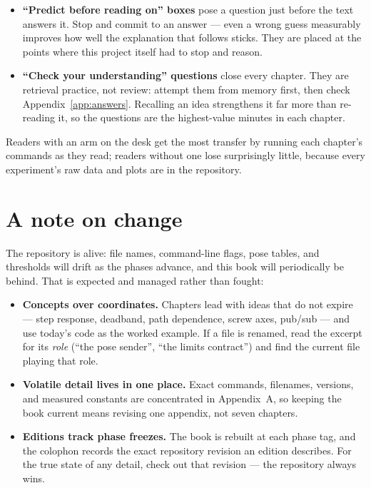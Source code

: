 \documentclass[11pt,twoside,openright]{book}
\begin{document}
\begin{itemize}
  \item \textbf{``Predict before reading on'' boxes} pose a question just
    before the text answers it. Stop and commit to an answer --- even a
    wrong guess measurably improves how well the explanation that follows
    sticks. They are placed at the points where this project itself had
    to stop and reason.
  \item \textbf{``Check your understanding'' questions} close every
    chapter. They are retrieval practice, not review: attempt them from
    memory first, then check Appendix~\ref{app:answers}. Recalling an
    idea strengthens it far more than re-reading it, so the questions are
    the highest-value minutes in each chapter.
\end{itemize}

Readers with an arm on the desk get the most transfer by running each
chapter's commands as they read; readers without one lose surprisingly
little, because every experiment's raw data and plots are in the
repository.

\section*{A note on change}

The repository is alive: file names, command-line flags, pose tables, and
thresholds will drift as the phases advance, and this book will
periodically be behind. That is expected and managed rather than fought:

\begin{itemize}
  \item \textbf{Concepts over coordinates.} Chapters lead with ideas that
    do not expire --- step response, deadband, path dependence, screw
    axes, pub/sub --- and use today's code as the worked example. If a
    file is renamed, read the excerpt for its \emph{role} (``the pose
    sender'', ``the limits contract'') and find the current file playing
    that role.
  \item \textbf{Volatile detail lives in one place.} Exact commands,
    filenames, versions, and measured constants are concentrated in
    Appendix~A, so keeping the book current means revising one appendix,
    not seven chapters.
  \item \textbf{Editions track phase freezes.} The book is rebuilt at
    each phase tag, and the colophon records the exact repository
    revision an edition describes. For the true state of any detail,
    check out that revision --- the repository always wins.
\end{itemize}
\end{document}
